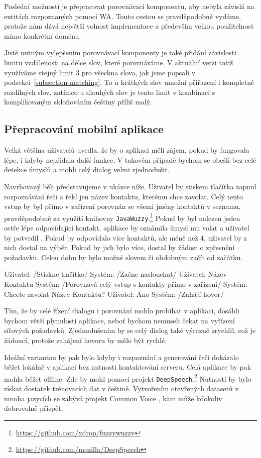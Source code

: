 Poslední možností je přepracovat porovnávací komponentu, aby nebyla závislá
na entitách rozpoznaných pomocí WA. Touto cestou se pravděpodobně vydáme,
protože nám dává největší volnost implementace a především velkou
použitelnost mimo konkrétní doménu.

Jistě nutným vylepšením porovnávací komponenty je také přidání závislosti
limitu vzdálenosti na délce slov, které porovnáváme. V aktuální verzi
totiž využíváme stejný limit 3 pro všechna slova, jak jsme popsali
v podsekci~\ref{subsection-matching}. To u krátkých slov umožní
přiřazení i kompletně rozdílných slov, zatímco u dlouhých
slov je tento limit v kombinaci s komplikovaným skloňováním češtiny
příliš malý.

\subsection{Přepracování mobilní aplikace}\label{better-app}

Velká většina uživatelů uvedla, že by o aplikaci měli zájem, pokud by fungovala
lépe, i kdyby nepřidala další funkce. V takovém případě bychom se obešli
bez celé detekce úmyslů a mohli celý dialog velmi zjednodušit.

Navrhovaný běh představujeme v ukázce níže. Uživatel by stiskem
tlačítka zapnul rozpoznávání řeči a řekl jen název kontaktu,
kterému chce zavolat. Celý tento vstup by byl přímo v zařízení
porovnán se všemi jmény kontaktů v seznamu, pravděpodobně za
využití knihovny \texttt{JavaWuzzy}.\footnote{\url{https://github.com/xdrop/fuzzywuzzy}} Pokud by byl
nalezen jeden ostře lépe odpovídající kontakt, aplikace
by oznámila úmysl mu volat a uživatel by potvrdil .
Pokud by odpovídalo více kontaktů, ale méně než 4, uživatel
by z nich dostal na výběr. Pokud by jich bylo více, dostal by
žádost o zpřesnění požadavku. Celou dobu by bylo možné slovem
 či obdobným začít od začátku.
\begin{code}
    Uživatel: /Stiskne tlačítko/
    Systém:   /Začne naslouchat/
    Uživatel: Název Kontaktu
    Systém:   /Porovnává celý vstup s kontakty přímo v zařízení/
    Systém:   Chcete zavolat Název Kontaktu?
    Uživatel: Ano
    Systém:   /Zahájí hovor/
\end{code}

Tím, že by celé řízení dialogu i porovnání mohlo probíhat v aplikaci,
dosáhli bychom větší plynulosti aplikace, neboť bychom nemuseli čekat
na vyřízení síťových požadavků. Zjednodušením by se celý dialog také
výrazně zrychlil, což je žádoucí, protože zahájení hovoru by mělo
být rychlé.

Ideální variantou by pak bylo kdyby i rozpoznání a generování řeči
dokázalo běžet lokálně v aplikaci bez nutnosti kontaktování serveru.
Celá aplikace by pak mohla běžet offline. Zde by mohl pomoci projekt
\texttt{DeepSpeech}.\footnote{\url{https://github.com/mozilla/DeepSpeech}}
Nutností by bylo získat dostatek trénovacích dat v češtině. Vytvořením
otevřených datasetů v mnoha jazycích se zabývá projekt Common Voice \citep{commonvoice_2020},
kam může kdokoliv dobrovolně přispět.